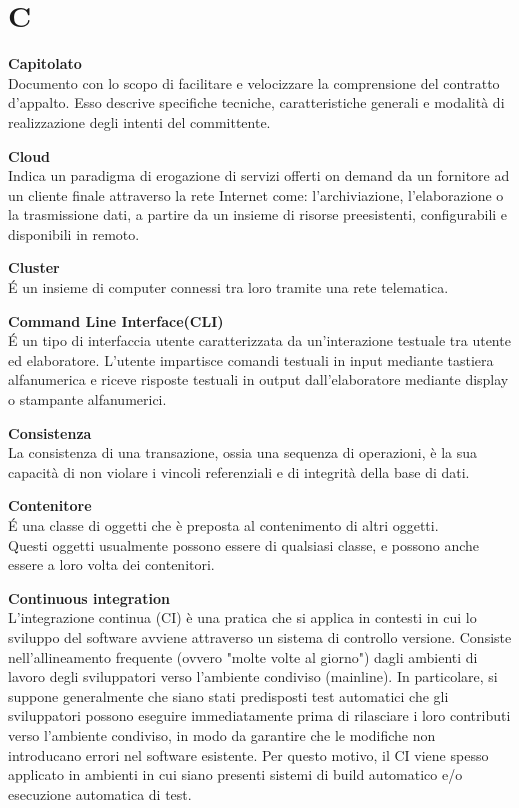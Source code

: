 \documentclass[a4paper, oneside, openany, dvipsnames, table, 12pt]{article}
\begin{document}
\newpage
\section{C}
\textbf{Capitolato}\\	
Documento con lo scopo di facilitare e velocizzare la comprensione del contratto d'appalto. Esso descrive specifiche tecniche, caratteristiche generali e modalità di realizzazione degli intenti del committente.

\textbf{Cloud} \\
Indica un paradigma di erogazione di servizi offerti on demand da un fornitore ad un cliente finale attraverso la rete Internet come: l'archiviazione, l'elaborazione o la trasmissione dati, a partire da un insieme di risorse preesistenti, configurabili e disponibili in remoto.

\textbf{Cluster} \\
\'E un insieme di computer connessi tra loro tramite una rete telematica.

\textbf{Command Line Interface(CLI)} \\
\'E un tipo di interfaccia utente caratterizzata da un'interazione testuale tra utente ed elaboratore. L'utente impartisce comandi testuali in input mediante tastiera alfanumerica e riceve risposte testuali in output dall'elaboratore mediante display o stampante alfanumerici. 

\textbf{Consistenza} \\
La consistenza di una transazione, ossia una sequenza di operazioni, è la sua capacità di non violare i vincoli referenziali e di integrità della base di dati.

\label{par:container}
\textbf{Contenitore} \\
\'E una classe di oggetti che è preposta al contenimento di altri oggetti. \\ 
Questi oggetti usualmente possono essere di qualsiasi classe, e possono anche essere a loro volta dei contenitori.

\textbf{Continuous integration} \\
L'integrazione continua (CI) è una pratica che si applica in contesti in cui lo sviluppo del software avviene attraverso un sistema di controllo versione. Consiste nell'allineamento frequente (ovvero "molte volte al giorno") dagli ambienti di lavoro degli sviluppatori verso l'ambiente condiviso (mainline).
In particolare, si suppone generalmente che siano stati predisposti test automatici che gli sviluppatori possono eseguire immediatamente prima di rilasciare i loro contributi verso l'ambiente condiviso, in modo da garantire che le modifiche non introducano errori nel software esistente. Per questo motivo, il CI viene spesso applicato in ambienti in cui siano presenti sistemi di build automatico e/o esecuzione automatica di test.
\end{document}
